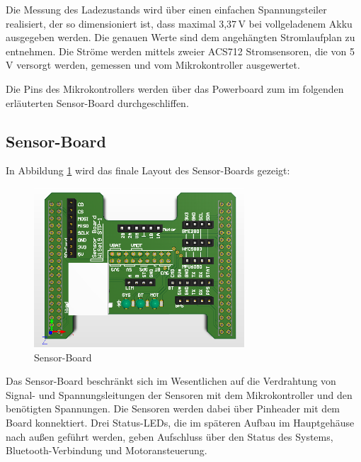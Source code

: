Die Messung des Ladezustands wird über einen einfachen Spannungsteiler realisiert, der so dimensioniert ist, dass maximal 3,37\,V bei vollgeladenem Akku ausgegeben werden. Die genauen Werte sind dem angehängten Stromlaufplan zu entnehmen. Die Ströme werden mittels zweier ACS712 Stromsensoren, die von 5\,V versorgt werden, gemessen und vom Mikrokontroller ausgewertet.

Die Pins des Mikrokontrollers werden über das Powerboard zum im folgenden erläuterten Sensor-Board durchgeschliffen.

\subsection{Sensor-Board}
In Abbildung \ref{fig.sensorboard} wird das finale Layout des Sensor-Boards gezeigt:

\begin{figure}[H]
  \centering
  \includegraphics[width=0.7\textwidth]{./img/PCB_Sensors_3D_top.png}
  \caption{Sensor-Board}\label{fig.sensorboard}
\end{figure}

Das Sensor-Board beschränkt sich im Wesentlichen auf die Verdrahtung von Signal- und Spannungsleitungen der Sensoren mit dem Mikrokontroller und den benötigten Spannungen. Die Sensoren werden dabei über Pinheader mit dem Board konnektiert. Drei Status-LEDs, die im späteren Aufbau im Hauptgehäuse nach außen geführt werden, geben Aufschluss über den Status des Systems, Bluetooth-Verbindung und Motoransteuerung.







